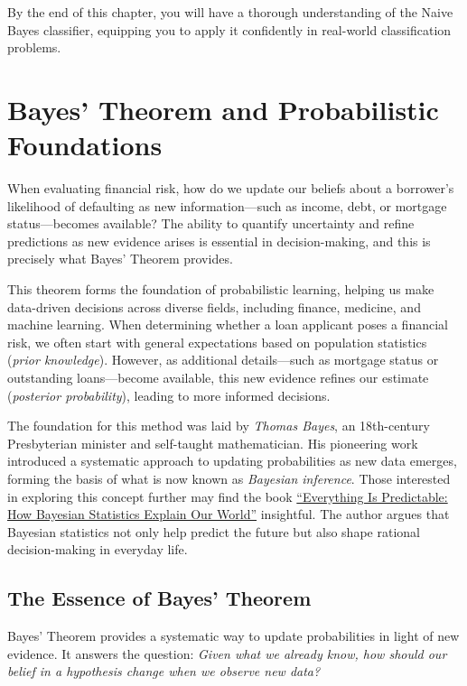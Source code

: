 \documentclass[
]{book}
\theoremstyle{definition}
\theoremstyle{definition}
\theoremstyle{definition}
\theoremstyle{definition}
\theoremstyle{remark}
\begin{document}
By the end of this chapter, you will have a thorough understanding of the Naive Bayes classifier, equipping you to apply it confidently in real-world classification problems.

\section{Bayes' Theorem and Probabilistic Foundations}\label{bayes-theorem-and-probabilistic-foundations}

When evaluating financial risk, how do we update our beliefs about a borrower's likelihood of defaulting as new information---such as income, debt, or mortgage status---becomes available? The ability to quantify uncertainty and refine predictions as new evidence arises is essential in decision-making, and this is precisely what Bayes' Theorem provides.

This theorem forms the foundation of probabilistic learning, helping us make data-driven decisions across diverse fields, including finance, medicine, and machine learning. When determining whether a loan applicant poses a financial risk, we often start with general expectations based on population statistics (\emph{prior knowledge}). However, as additional details---such as mortgage status or outstanding loans---become available, this new evidence refines our estimate (\emph{posterior probability}), leading to more informed decisions.

The foundation for this method was laid by \emph{Thomas Bayes}, an 18th-century Presbyterian minister and self-taught mathematician. His pioneering work introduced a systematic approach to updating probabilities as new data emerges, forming the basis of what is now known as \emph{Bayesian inference}. Those interested in exploring this concept further may find the book \href{https://www.goodreads.com/book/show/199798096-everything-is-predictable}{``Everything Is Predictable: How Bayesian Statistics Explain Our World''} insightful. The author argues that Bayesian statistics not only help predict the future but also shape rational decision-making in everyday life.

\subsection*{The Essence of Bayes' Theorem}\label{the-essence-of-bayes-theorem}

Bayes' Theorem provides a systematic way to update probabilities in light of new evidence. It answers the question: \emph{Given what we already know, how should our belief in a hypothesis change when we observe new data?}
\end{document}
